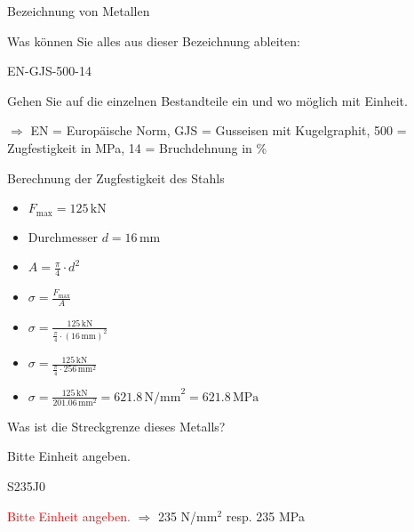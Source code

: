\begin{frame}{Bezeichnung von Metallen}
	\begin{Fragenblock}
		Was können Sie alles aus dieser Bezeichnung ableiten: 

		EN-GJS-500-14
		
		Gehen Sie auf die einzelnen Bestandteile ein und wo möglich mit Einheit.

	\end{Fragenblock}
	\pause
	\vspace{1cm}
	$\Rightarrow$ EN = Europäische Norm, GJS = Gusseisen mit Kugelgraphit, 500 = Zugfestigkeit in MPa, 14 = Bruchdehnung in \%

\end{frame}


\begin{frame}{Berechnung der Zugfestigkeit des Stahls}
	\begin{itemize}
		\item [\textbullet] $F_{\text{max}} = 125 \, \text{kN}$
		\item [\textbullet] Durchmesser $d = 16 \, \text{mm}$
		\item [\textbullet] $A = \frac{\pi}{4} \cdot d^2$
		\item [\textbullet] $\sigma = \frac{F_{\text{max}}}{A}$
		\item [\textbullet] $\sigma =  \frac{125 \, \text{kN}}{\frac{\pi}{4} \cdot (16 \, \text{mm})^2}$
		\item [\textbullet] $\sigma =  \frac{125 \, \text{kN}}{\frac{\pi}{4} \cdot 256 \, \text{mm}^2}$ 
		\item [\textbullet] $\sigma =  \frac{125 \, \text{kN}}{201.06 \, \text{mm}^2} = 621.8 \, \text{N/mm}^2 = 621.8 \, \text{MPa}$
	\end{itemize}

\end{frame}


\begin{frame}{Was ist die Streckgrenze dieses Metalls?}
	\begin{Fragenblock}
		Bitte Einheit angeben.

		S235J0
	\end{Fragenblock}

	\pause
	\vspace{1cm}
	\textcolor{red}{Bitte Einheit angeben.}
	$\Rightarrow$ 235 N/mm$^2$ resp. 235 MPa

\end{frame}


